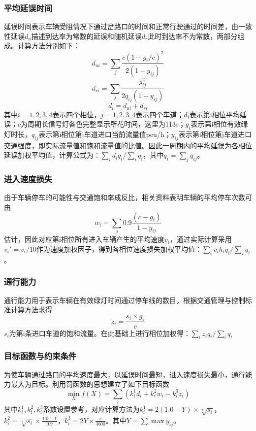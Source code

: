 \subsubsection{平均延误时间}
延误时间表示车辆受阻情况下通过岔路口的时间和正常行驶通过的时间差，由一致性延误$d_{u}$描述到达率为常数的延误和随机延误$d_{r}$此时到达率不为常数，两部分组成。计算方法分别如下：
\begin{equation}
    d_{ui}=\sum_{j} \frac{c\left(1-g_{i} / c\right)^{2}}{2\left(1-y_{i j}\right)}
\end{equation}
\begin{equation}
    d_{ri}=\sum_{j} \frac{y_{i j}^{2}}{2 q_{i j}\left(1-y_{i j}\right)}
\end{equation}
\begin{equation}
    d_{i}=d_{ui}+d_{ri}
\end{equation}
其中$i = 1,2,3,4$表示四个相位，$j=1,2,3,4$表示四个车道；$d_i$表示第i相位平均延误；$c$为周期长信号灯各色完整显示所花时间，这里为113s；$g_i$表示第i相位有效绿灯时长，$q_{ij}$表示第i相位第j车道进口当前流量值pcu/h；$y_{ij}$表示第i相位第j车道进口交通强度，即实际流量值和饱和流量值的比值。因此一周期内的平均延误为各相位延误加权平均值，计算公式为：$\sum_{i} d_i q_{i} /\sum_{i} q_{i}$，其中$q_{i}=\sum_{j} q_{ij}$。

\subsubsection{进入速度损失}
由于车辆停车的可能性与交通饱和率成反比，相关资料表明车辆的平均停车次数可由
\begin{equation}
    w_{i}=\sum_{j} 0.9 \frac{\left(c-g_{i}\right)}{1-y_{i j}}
\end{equation}
估计，因此对应第i相位所有进入车辆产生的平均速度$v_i$，通过实际计算采用$v_i'=v_i/10$作为速度加权因子，得到各相位速度损失加权平均值：$\sum_{i}v_i h_i q_{i} /\sum_{i} q_{i}$。

\subsubsection{通行能力}
通行能力用于表示车辆在有效绿灯时间通过停车线的数目，根据交通管理与控制标准计算方法求得
\begin{equation}
    z_{i}=\frac{s_{i} \times g_{i}}{c}
\end{equation}
$s_i$为第i条进口车道的饱和流量。在此基础上进行相位加权得：$\sum_{i} z_i q_{i} /\sum_{i} q_{i}$

\subsubsection{目标函数与约束条件}
为使车辆通过路口的平均速度最大，以延误时间最短，进入速度损失最小，通行能力最大为目标。利用罚函数的思想建立了如下目标函数
\begin{equation}
    \min _{X} f(X)=\sum_{i}( k_{i}^{1} d_{i}+k_{i}^{2} w_{i}-k_{i}^{3} z_{i})
\end{equation}
其中$k_{i}^{1}, k_{i}^{2}, k_{i}^{3}$系数设置参考\cite{顾怀中1998交叉口交通信号配时模拟退火全局优化算法}，对应计算方法为$k_{i}^{1}=2(1.0-Y) \times \sqrt[7]{s_{i}}$，$ k_{i}^{2}=\sqrt[7]{s_{i}} \times \frac{1.0-Y}{0.9}$，$k_{i}^{3}=2 Y \times \frac{c}{3600}$。其中$Y=\sum \operatorname{max}y_{ij}$。


